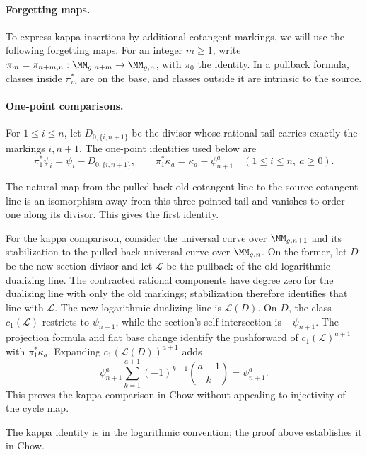 \paragraph{Forgetting maps.}
To express kappa insertions by additional cotangent markings, we will
use the following forgetting maps.
For an integer $m\geq1$, write
$\pi_m=\pi_{n+m,n}:\MM_{g,n+m}\to\MM_{g,n}$, with
$\pi_0$ the identity.  In a pullback formula, classes inside
$\pi_m^*$ are on the base, and classes outside it are intrinsic to
the source.

\paragraph{One-point comparisons.}
For $1\leq i\leq n$, let
$D_{0,\{i,n+1\}}$ be the divisor whose rational tail carries exactly
the markings $i,n+1$.  The one-point identities used below are
\begin{equation}
\label{eq:s02:one-point-comparison}
\pi_1^*\psi_i=\psi_i-D_{0,\{i,n+1\}},\qquad
\pi_1^*\kappa_a=\kappa_a-\psi_{n+1}^a
\quad(1\leq i\leq n,\ a\geq0).
\end{equation}
\begin{prf}
The natural map from the pulled-back old cotangent line to the
source cotangent line is an isomorphism away from this three-pointed
tail and vanishes to order one along its divisor. This gives the
first identity.

For the kappa comparison, consider the universal curve over
$\MM_{g,n+1}$ and its stabilization to the pulled-back universal
curve over $\MM_{g,n}$.  On the former, let $D$ be the new section
divisor and let $\mathcal L$ be the pullback of the old logarithmic
dualizing line.  The contracted rational components have degree zero
for the dualizing line with only the old markings; stabilization
therefore identifies that line with $\mathcal L$.  The new
logarithmic dualizing line is $\mathcal L(D)$.  On $D$, the class
$c_1(\mathcal L)$ restricts to $\psi_{n+1}$, while the section's
self-intersection is $-\psi_{n+1}$.  The projection formula and flat
base change identify the pushforward of $c_1(\mathcal L)^{a+1}$
with $\pi_1^*\kappa_a$.  Expanding $c_1(\mathcal L(D))^{a+1}$ adds
\[
\psi_{n+1}^a\sum_{k=1}^{a+1}(-1)^{k-1}\binom{a+1}{k}
=\psi_{n+1}^a.
\]
This proves the kappa comparison in Chow without appealing to
injectivity of the cycle map.
\end{prf}

\begin{rmk}
\label{rmk:s02:comparison-source}
The kappa identity is \cite[(2.10)]{KMZ96v1} in the logarithmic
convention; the proof above establishes it in Chow.
\end{rmk}

